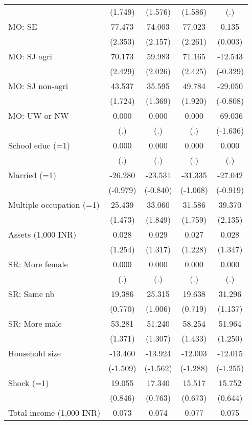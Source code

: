 \begin{table}[htbp]
{\begin{tabular}{lcccc}
          & (1.749) & (1.576) & (1.586) & (.) \\
    MO: SE & 77.473 & 74.003 & 77.023 & 0.135 \\
          & (2.353) & (2.157) & (2.261) & (0.003) \\
    MO: SJ agri & 70.173 & 59.983 & 71.165 & -12.543 \\
          & (2.429) & (2.026) & (2.425) & (-0.329) \\
    MO: SJ non-agri & 43.537 & 35.595 & 49.784 & -29.050 \\
          & (1.724) & (1.369) & (1.920) & (-0.808) \\
    MO: UW or NW & 0.000 & 0.000 & 0.000 & -69.036 \\
          & (.)   & (.)   & (.)   & (-1.636) \\
    School educ (=1) & 0.000 & 0.000 & 0.000 & 0.000 \\
          & (.)   & (.)   & (.)   & (.) \\
    Married (=1) & -26.280 & -23.531 & -31.335 & -27.042 \\
          & (-0.979) & (-0.840) & (-1.068) & (-0.919) \\
    Multiple occupation (=1) & 25.439 & 33.060 & 31.586 & 39.370 \\
          & (1.473) & (1.849) & (1.759) & (2.135) \\
    Assets (1,000 INR) & 0.028 & 0.029 & 0.027 & 0.028 \\
          & (1.254) & (1.317) & (1.228) & (1.347) \\
    SR: More female & 0.000 & 0.000 & 0.000 & 0.000 \\
          & (.)   & (.)   & (.)   & (.) \\
    SR: Same nb & 19.386 & 25.315 & 19.638 & 31.296 \\
          & (0.770) & (1.006) & (0.719) & (1.137) \\
    SR: More male & 53.281 & 51.240 & 58.254 & 51.964 \\
          & (1.371) & (1.307) & (1.433) & (1.250) \\
    Household size & -13.460 & -13.924 & -12.003 & -12.015 \\
          & (-1.509) & (-1.562) & (-1.288) & (-1.255) \\
    Shock (=1) & 19.055 & 17.340 & 15.517 & 15.752 \\
          & (0.846) & (0.763) & (0.673) & (0.644) \\
    Total income (1,000 INR) & 0.073 & 0.074 & 0.077 & 0.075 \\

\end{tabular}}
\end{table}
